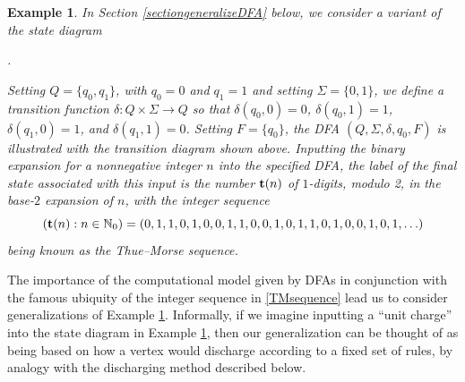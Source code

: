 \documentclass[12pt]{article}
\newtheorem{example}{Example}
\begin{document}
\begin{example}\label{exTM}
 In Section \ref{sectiongeneralizeDFA} below, we consider a variant of the state diagram 
\begin{center}
. 
\end{center}
 Setting $Q = \{ q_{0}, q_{1} \}$, with $q_{0} = 0$ and $q_{1} = 1$ and setting $\Sigma = \{ 0, 1 \}$, we define a transition function 
 $\delta\colon Q \times \Sigma \to Q$ so that $\delta(q_0, 0) = 0$, $\delta(q_0, 1) = 1$, $\delta(q_1, 0) = 1$, and $\delta(q_1, 
 1) = 0$. Setting $F = \{ q_{0} \}$, the DFA $(Q, \Sigma, \delta, q_0, F)$ is illustrated with the transition diagram shown above. 
 Inputting the binary expansion for a nonnegative integer $n$ into the specified DFA, the label of the final state associated with this 
 input is the number $\text{{\bf t}}(n)$ of $1$-digits, modulo 2, in the base-$2$ expansion of $n$, with the integer sequence 
\begin{equation}\label{TMsequence}
 (\text{{\bf t}}(n) : n \in \mathbb{N}_{0}) = (0, 1, 1, 0, 1, 0, 0, 1, 1, 0, 0, 1, 0, 1, 1, 0, 1, 0, 0, 1, 0, 1, \ldots) 
\end{equation}
 being known as the \emph{Thue--Morse sequence}. 
\end{example}

 The importance of the computational model given by DFAs in conjunction with the famous ubiquity of the integer sequence in 
 \eqref{TMsequence} \cite{AlloucheShallit1999} lead us to consider generalizations of Example \ref{exTM}. Informally, if we imagine 
 inputting a ``unit charge'' into the state diagram in Example \ref{exTM}, then our generalization can be thought of as being based on 
 how a vertex would discharge according to a fixed set of rules, by analogy with the discharging method described below. 
\end{document}
